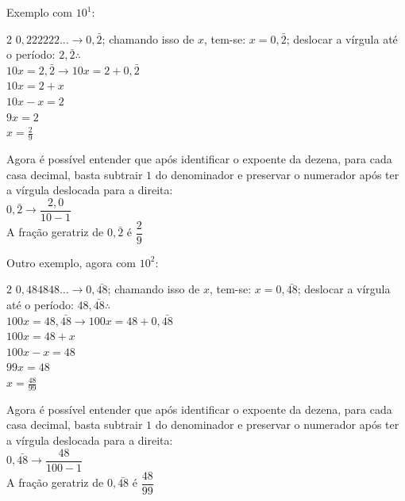 Exemplo com $ 10^1 $:
\begin{multicols}{2}
		\setlength{\columnseprule}{.5pt}
	$ 0,222222 \hdots  \longrightarrow 0,\bar{2} $;
	chamando isso de $ x $, tem-se: $ x = 0,\bar{2} $;
	deslocar a vírgula até o período: $ 2,\bar{2} \therefore $ \\
	$ 10x = 2,\bar{2} \longrightarrow 10x = 2 + 0,\bar{2} $\\
	$ 10x = 2 + x $ \\
	$ 10x - x = 2 $\\
	$ 9x = 2 $\\
	$ x = \frac{2}{9} $
	
	\columnbreak
	Agora é possível entender que após identificar o expoente da dezena, para cada casa decimal, basta subtrair $ 1 $ do denominador e preservar o numerador após ter a vírgula deslocada para a direita:\\
	
	$ 0,\bar{2} \longrightarrow \dfrac{2,0}{10-1} $\\
	 A fração geratriz de $ 0,\bar{2} $ é $ \dfrac{2}{9} $
	
\end{multicols}

Outro exemplo, agora com $ 10^2 $:
\begin{multicols}{2}
	\setlength{\columnseprule}{.5pt}
	$ 0,484848 \hdots  \longrightarrow 0,\bar{48} $;
	chamando isso de $ x $, tem-se: $ x = 0,\bar{48} $;
	deslocar a vírgula até o período: $ 48,\bar{48} \therefore $ \\
	$ 100x = 48,\bar{48} \longrightarrow 100x = 48 + 0,\bar{48} $\\
	$ 100x = 48 + x $ \\
	$ 100x - x = 48 $\\
	$ 99x = 48 $\\
	$ x = \frac{48}{99} $
	
	\columnbreak
	Agora é possível entender que após identificar o expoente da dezena, para cada casa decimal, basta subtrair $ 1 $ do denominador e preservar o numerador após ter a vírgula deslocada para a direita:\\
	
	$ 0,\bar{48} \longrightarrow \dfrac{48}{100-1} $\\
	A fração geratriz de $ 0,\bar{48} $ é $ \dfrac{48}{99} $
	
\end{multicols}

\pagebreak

